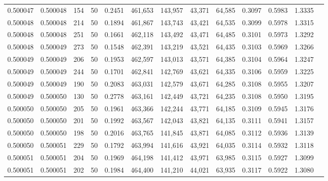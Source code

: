 \begin{tabular}{rrrrrrrrrrrrr}
0.500047 & 0.500048 &   154 &  50 &                                     0.2451 & 461,653 & 143,957 &  43,371 &  64,585 & 0.3097 & 0.5983 & 1.3335 \\
0.500048 & 0.500048 &   214 &  50 &                                     0.1894 & 461,867 & 143,743 &  43,421 &  64,535 & 0.3099 & 0.5978 & 1.3315 \\
0.500048 & 0.500048 &   251 &  50 &                                     0.1661 & 462,118 & 143,492 &  43,471 &  64,485 & 0.3101 & 0.5973 & 1.3292 \\
0.500048 & 0.500049 &   273 &  50 &                                     0.1548 & 462,391 & 143,219 &  43,521 &  64,435 & 0.3103 & 0.5969 & 1.3266 \\
0.500049 & 0.500049 &   206 &  50 &                                     0.1953 & 462,597 & 143,013 &  43,571 &  64,385 & 0.3104 & 0.5964 & 1.3247 \\
0.500049 & 0.500049 &   244 &  50 &                                     0.1701 & 462,841 & 142,769 &  43,621 &  64,335 & 0.3106 & 0.5959 & 1.3225 \\
0.500049 & 0.500049 &   190 &  50 &                                     0.2083 & 463,031 & 142,579 &  43,671 &  64,285 & 0.3108 & 0.5955 & 1.3207 \\
0.500049 & 0.500050 &   130 &  50 &                                     0.2778 & 463,161 & 142,449 &  43,721 &  64,235 & 0.3108 & 0.5950 & 1.3195 \\
0.500050 & 0.500050 &   205 &  50 &                                     0.1961 & 463,366 & 142,244 &  43,771 &  64,185 & 0.3109 & 0.5945 & 1.3176 \\
0.500050 & 0.500050 &   201 &  50 &                                     0.1992 & 463,567 & 142,043 &  43,821 &  64,135 & 0.3111 & 0.5941 & 1.3157 \\
0.500050 & 0.500050 &   198 &  50 &                                     0.2016 & 463,765 & 141,845 &  43,871 &  64,085 & 0.3112 & 0.5936 & 1.3139 \\
0.500050 & 0.500051 &   229 &  50 &                                     0.1792 & 463,994 & 141,616 &  43,921 &  64,035 & 0.3114 & 0.5932 & 1.3118 \\
0.500051 & 0.500051 &   204 &  50 &                                     0.1969 & 464,198 & 141,412 &  43,971 &  63,985 & 0.3115 & 0.5927 & 1.3099 \\
0.500051 & 0.500051 &   202 &  50 &                                     0.1984 & 464,400 & 141,210 &  44,021 &  63,935 & 0.3117 & 0.5922 & 1.3080 \\

\end{tabular}
